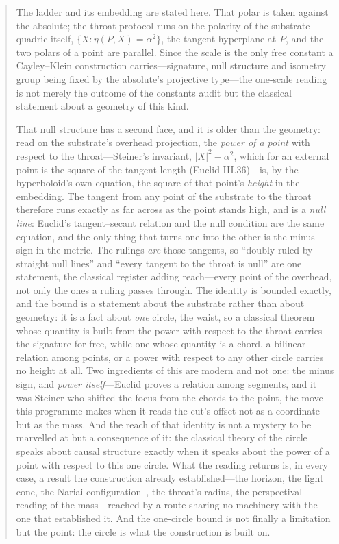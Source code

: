 \documentclass[11pt,a4paper]{article}
\theoremstyle{definition}
\begin{document}
\begin{abstract}
The ladder and its embedding are stated here. That polar is taken against the absolute; the throat protocol runs on the polarity of the substrate quadric itself, $\{X:\eta(P,X)=\alpha^{2}\}$, the tangent hyperplane at $P$, and the two polars of a point are parallel. Since the scale is the only
free constant a Cayley--Klein construction carries---signature, null structure
and isometry group being fixed by the absolute's projective type---the
one-scale reading is not merely the outcome of the constants audit but the
classical statement about a geometry of this kind. 

That null structure has a second face, and it is older than the
geometry: read on the substrate's overhead projection, the \emph{power of a
point} with respect to the throat---Steiner's invariant, $|X|^{2}-\alpha^{2}$,
which for an external point is the square of the tangent length (Euclid
III.36)---is, by the hyperboloid's own equation, the square of that point's
\emph{height} in the embedding. The tangent from any point of the substrate to
the throat therefore runs exactly as far across as the point stands high, and is
a \emph{null line}: Euclid's tangent--secant relation and the null condition are
the same equation, and the only thing that turns one into the other is the minus
sign in the metric. The rulings \emph{are} those tangents, so ``doubly ruled by
straight null lines'' and ``every tangent to the throat is null'' are one
statement, the classical register adding reach---every point of the overhead,
not only the ones a ruling passes through. The identity is bounded exactly, and
the bound is a statement about the substrate rather than about geometry: it is a
fact about \emph{one} circle, the waist, so a classical theorem whose quantity is
built from the power with respect to the throat carries the signature for free,
while one whose quantity is a chord, a bilinear relation among points, or a
power with respect to any other circle carries no height at all. Two ingredients
of this are modern and not one: the minus sign, and \emph{power itself}---Euclid
proves a relation among segments, and it was Steiner who shifted the focus from
the chords to the point, the move this programme makes when it reads the cut's
offset not as a coordinate but as the mass. And the reach of that
identity is not a mystery to be marvelled at but a consequence of it: the
classical theory of the circle speaks about causal structure exactly when it
speaks about the power of a point with respect to this one circle. What the
reading returns is, in every case, a result the construction already
established---the horizon, the light cone, the Nariai configuration~\cite{Nariai1951}, the throat's
radius, the perspectival reading of the mass---reached by a route sharing no
machinery with the one that established it. And the one-circle bound is not
finally a limitation but the point: the circle is what the construction is built
on. 


\end{abstract}
\end{document}

